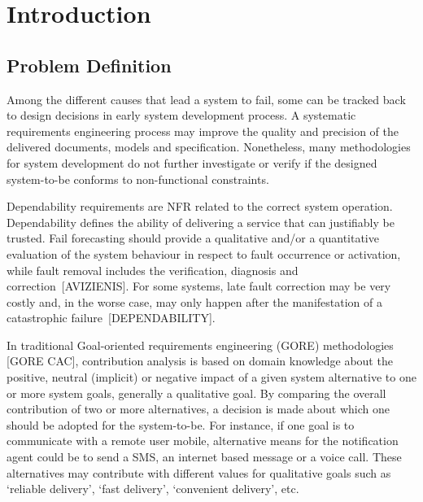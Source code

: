 \chapter{Introduction}\label{ch_introduction}%

\section{Problem Definition}

Among the different causes that lead a system to fail, some can be tracked back to design decisions in early system development process. A systematic requirements engineering process may improve the quality and precision of the delivered documents, models and specification. Nonetheless, many methodologies for system development do not further investigate or verify if the designed system-to-be conforms to non-functional constraints.  



Dependability requirements are NFR related to the correct system operation. Dependability defines the ability of delivering a service that can justifiably be trusted. Fail forecasting should provide a qualitative and/or a quantitative evaluation of the system behaviour in respect to fault occurrence or activation, while fault removal includes the verification, diagnosis and correction~[AVIZIENIS]. For some systems, late fault correction may be very costly and, in the worse case, may only happen after the manifestation of a catastrophic failure~[DEPENDABILITY].

In traditional Goal-oriented requirements engineering (GORE) methodologies [GORE CAC], contribution  analysis is based on domain knowledge about the positive, neutral (implicit) or negative impact of a given system alternative to one or more system goals, generally a qualitative goal. By  comparing the overall contribution of two or more alternatives, a decision is made about which one should be adopted for the system-to-be. For instance, if one goal is to communicate with a remote user mobile, alternative means for the notification agent could be to send a SMS, an internet based message or a voice call. These alternatives may contribute with different values for qualitative goals such as `reliable delivery', `fast delivery', `convenient delivery', etc. 

